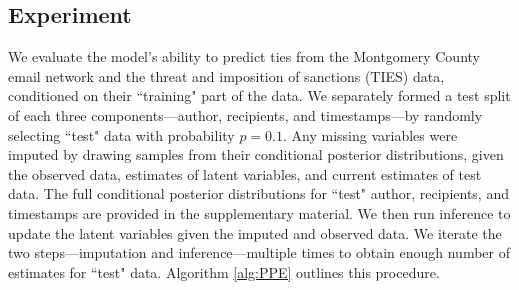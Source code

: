 \documentclass[12pt]{article}
\begin{document}
\subsection{Experiment}\label{subsubsec:Experiment_email}
We evaluate the model's ability to predict ties from the Montgomery County email network and the threat and imposition of sanctions (TIES) data, conditioned on their ``training" part of the data. We separately formed a test split of each three components---author, recipients, and timestamps---by randomly selecting ``test" data with probability $p=0.1$. Any missing variables were imputed by drawing samples from their conditional posterior distributions, given the observed data, estimates of latent variables, and current estimates of test data. The full conditional posterior distributions for ``test" author, recipients, and timestamps are provided in the supplementary material. We then run inference to update the latent variables given the imputed and observed data. We iterate the two steps---imputation and inference---multiple times to obtain enough number of estimates for ``test" data. Algorithm \ref{alg:PPE} outlines this procedure.
\end{document}

